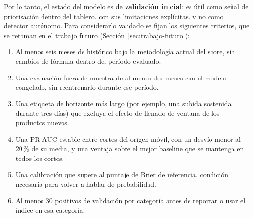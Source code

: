Por lo tanto, el estado del modelo es de \textbf{validación inicial}: es útil como señal de priorización dentro del tablero, con sus limitaciones explícitas, y no como detector autónomo. Para considerarlo validado se fijan los siguientes criterios, que se retoman en el trabajo futuro (Sección~\ref{sec:trabajo-futuro}):

\begin{enumerate}
	\item Al menos seis meses de histórico bajo la metodología actual del score, sin cambios de fórmula dentro del período evaluado.
	\item Una evaluación fuera de muestra de al menos dos meses con el modelo congelado, sin reentrenarlo durante ese período.
	\item Una etiqueta de horizonte más largo (por ejemplo, una subida sostenida durante tres días) que excluya el efecto de llenado de ventana de los productos nuevos.
	\item Una PR-AUC estable entre cortes del origen móvil, con un desvío menor al 20\,\% de su media, y una ventaja sobre el mejor baseline que se mantenga en todos los cortes.
	\item Una calibración que supere al puntaje de Brier de referencia, condición necesaria para volver a hablar de probabilidad.
	\item Al menos 30 positivos de validación por categoría antes de reportar o usar el índice en esa categoría.
\end{enumerate}
